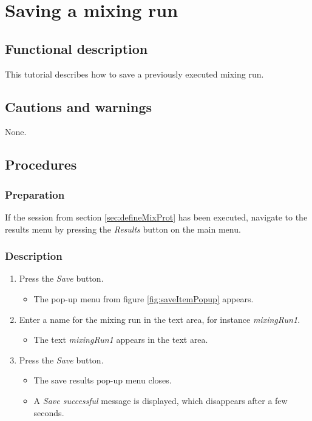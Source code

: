 \section{Saving a mixing run}\label{sec:savmixrun}

\subsection{Functional description}
This tutorial describes how to save a previously executed mixing run.

\subsection{Cautions and warnings}
None.

\subsection{Procedures}

\subsubsection{Preparation}
If the session from section \ref{sec:defineMixProt} has been executed, navigate to the results menu by pressing the \emph{Results} button on the main menu.

\subsubsection{Description}
\begin{enumerate}
	\item Press the \emph{Save} button.
		\begin{itemize}
			\item The pop-up menu from figure \ref{fig:saveItemPopup} appears.
		\end{itemize}
	\item Enter a name for the mixing run in the text area, for instance \emph{mixingRun1}.
		\begin{itemize}
			\item The text \emph{mixingRun1} appears in the text area.
		\end{itemize}
	\item Press the \emph{Save} button. \label{item:savmixrunName}
		\begin{itemize}
			\item The save results pop-up menu closes.
			\item A \emph{Save successful} message is displayed, which disappears after a few seconds.
		\end{itemize}
\end{enumerate}

